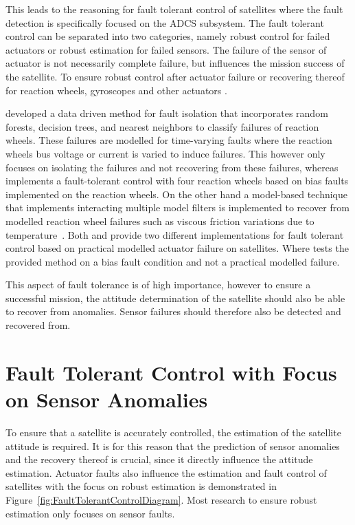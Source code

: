 This leads to the reasoning for fault tolerant control of satellites where the fault detection is specifically focused on the ADCS subsystem. The fault tolerant control can be separated into two categories, namely robust control for failed actuators or robust estimation for failed sensors. The failure of the sensor of actuator is not necessarily complete failure, but influences the mission success of the satellite. To ensure robust control after actuator failure or recovering thereof for reaction wheels, gyroscopes and other actuators \cite{Tudoroiu2007, rahimi2020fault, jin2008fault, wander2013innovative, ibrahim2018machine, ibrahim2020machine}. 

\cite{rahimi2020fault} developed a data driven method for fault isolation that incorporates random forests, decision trees, and nearest neighbors to classify failures of reaction wheels. These failures are modelled for time-varying faults where the reaction wheels bus voltage or current is varied to induce failures. This however only focuses on isolating the failures and not recovering from these failures, whereas \cite{jin2008fault} implements a fault-tolerant control with four reaction wheels based on bias faults implemented on the reaction wheels. On the other hand a model-based technique that implements interacting multiple model filters is implemented to recover from modelled reaction wheel failures such as viscous friction variations due to temperature~\cite{Tudoroiu2007}. Both \cite{Tudoroiu2007} and \cite{rahimi2020fault} provide two different implementations for fault tolerant control based on practical modelled actuator failure on satellites. Where \cite{jin2008fault} tests the provided method on a bias fault condition and not a practical modelled failure. 

This aspect of fault tolerance is of high importance, however to ensure a successful mission, the attitude determination of the satellite should also be able to recover from anomalies. Sensor failures should therefore also be detected and recovered from.

\section{Fault Tolerant Control with Focus on Sensor Anomalies}
To ensure that a satellite is accurately controlled, the estimation of the satellite attitude is required. It is for this reason that the prediction of sensor anomalies and the recovery thereof is crucial, since it directly influence the attitude estimation. Actuator faults also influence the estimation and fault control of satellites with the focus on robust estimation is demonstrated in Figure~\ref{fig:FaultTolerantControlDiagram}. Most research to ensure robust estimation only focuses on sensor faults.

